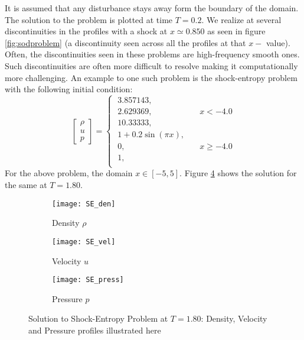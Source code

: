 \documentclass[11pt, a4paper]{report}
\begin{document}
It is assumed that any disturbance stays away form the boundary of the domain. The solution to the problem is plotted
at time $T=0.2$. We realize at several discontinuities in the profiles with a shock at $x \simeq 0.850$ as seen in figure
\ref{fig:sodproblem} (a discontinuity seen across all the profiles at that $x-$ value). Often, the discontinuities seen 
in these problems are high-frequency smooth ones. Such discontinuities are often more difficult to resolve making it
computationally more challenging. An example to one such problem is the shock-entropy problem with the following 
initial condition:
\begin{equation*}
    \left[\begin{array}{c} {\rho} \\ {u} \\ {p} \end{array}\right] = \begin{cases}
        \; 3.857143, & \\[-0.7em]
        \; 2.629369, & \quad x < -4.0 \\[-0.7em]
        \; 10.33333, & \\[0.5em]
        \; 1 + 0.2 \sin(\pi x), & \\[-0.7em]
        \; 0, & \quad x \geq -4.0 \\[-0.7em]
        \; 1, & \\
    \end{cases}
\end{equation*}
For the above problem, the domain $x\in[-5,5]$. Figure \ref{fig:shockentropy} shows the solution for the same at 
$T = 1.80$.

\begin{center}
    \begin{figure}[h]
         \begin{subfigure}{0.33\textwidth}
            \texttt{[image: SE\_den]} 
            \caption{Density $\rho$}
            \label{fig:SE_den}
        \end{subfigure}
        \begin{subfigure}{0.33\textwidth}
            \texttt{[image: SE\_vel]}
            \caption{Velocity $u$}
            \label{fig:SE_vel}
        \end{subfigure}
        \begin{subfigure}{0.33\textwidth}
            \texttt{[image: SE\_press]}
            \caption{Pressure $p$}
            \label{fig:SE_press}
        \end{subfigure}
         
        \caption{Solution to Shock-Entropy Problem at $T=1.80$: Density, Velocity and Pressure profiles illustrated here}
        \label{fig:shockentropy}
    \end{figure}
\end{center}
\end{document}
